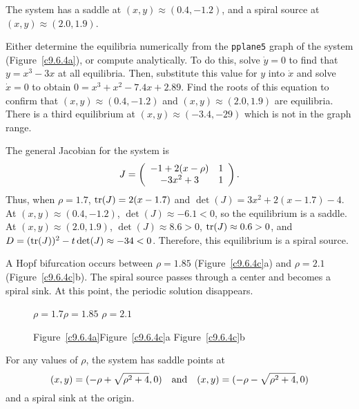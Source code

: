 \begin{figure}[htb]
                       \centerline{%
                       }
\end{figure}

\ans The system has a saddle at $(x,y) \approx (0.4,-1.2)$, and a 
spiral source at $(x,y) \approx (2.0,1.9)$.

\soln Either determine the equilibria numerically from the {\tt pplane5}
graph of the system (Figure~\ref{c9.6.4a}), or compute analytically.  To
do this, solve $\dot{y} = 0$ to find that $y = x^3 - 3x$ at all equilibria.
Then, substitute this value for $y$ into $\dot{x}$ and solve $\dot{x} = 0$
to obtain $0 = x^3 + x^2 - 7.4x + 2.89$.  Find the roots of this equation
to confirm that $(x,y) \approx (0.4,-1.2)$ and $(x,y) \approx (2.0,1.9)$
are equilibria.  There is a third equilibrium at $(x,y) \approx
(-3.4,-29)$ which is not in the graph range.

\para The general Jacobian for the system is
\[
J = \left(\begin{array}{cc} -1 + 2(x - \rho) & 1\\ -3x^2 + 3 &1\end{array}\right).
\]
Thus, when $\rho = 1.7$, ${\rm tr}(J) = 2(x - 1.7)$ and
$\det(J) = 3x^2 + 2(x - 1.7) - 4$.  At $(x,y) \approx (0.4,-1.2)$,
$\det(J) \approx -6.1 < 0$, so the equilibrium is a saddle.  At
$(x,y) \approx (2.0,1.9)$, $\det(J) \approx 8.6 > 0$, ${\rm tr}(J) \approx
0.6 > 0$, and $D = ({\rm tr}(J))^2 - t\det(J) \approx -34 < 0$.  Therefore,
this equilibrium is a spiral source.

 A Hopf bifurcation occurs between $\rho = 1.85$
(Figure~\ref{c9.6.4c}a) and $\rho = 2.1$ (Figure~\ref{c9.6.4c}b).  The
spiral source passes through a center and becomes a
spiral sink.  At this point, the periodic solution disappears.

\begin{figure}[htb]
                       \centerline{%
                       }
	\centerline{$\rho = 1.7$\hspace{1.3in}$\rho = 1.85$\hspace{1.3in}
$\rho = 2.1$}
	\centerline{Figure~\ref{c9.6.4a}\hspace{1.2in}Figure~\ref{c9.6.4c}a
\hspace{1.2in}Figure~\ref{c9.6.4c}b}
\end{figure}

\ans For any values of $\rho$, the system has saddle points at
\[
(x,y) = (-\rho + \sqrt{\rho^2 + 4},0) \quad\mbox{and}\quad
(x,y) = (-\rho - \sqrt{\rho^2 + 4},0)
\]
and a spiral sink at the origin.

